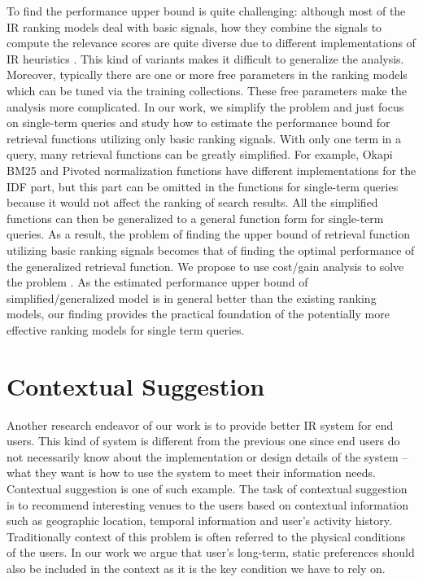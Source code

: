 To find the performance upper bound is quite challenging: although most of 
the IR ranking models deal with basic signals, how they combine the signals 
to compute the relevance scores are quite diverse due to different 
implementations of IR heuristics \cite{Fang:2004:FSI:1008992.1009004}. 
This kind of variants makes it difficult to generalize the analysis. 
Moreover, typically there are one or more free parameters in the ranking 
models which can be tuned via the training collections. 
These free parameters make the analysis more complicated.
In our work, we simplify the problem and just focus on single-term queries 
and study how to estimate the performance bound for retrieval functions 
utilizing only basic ranking signals. 
With only one term in a query, many retrieval functions can be greatly 
simplified. For example, Okapi BM25 and Pivoted normalization functions have 
different implementations for the IDF part, but this part can be omitted in the 
functions for single-term queries because it would not affect the ranking of 
search results. All the simplified functions can then be generalized to a 
general function form for single-term queries. As a result, the problem of 
finding the upper bound of retrieval function utilizing basic ranking signals 
becomes that of finding the optimal performance of the generalized retrieval 
function. We propose to use cost/gain analysis to solve the problem \cite{export:132652,export:68133,export:81144}. 
As the estimated performance upper bound of simplified/generalized model is 
in general better than the existing ranking models, our finding provides the 
practical foundation of the potentially more effective ranking models for 
single term queries.

\section{Contextual Suggestion}
Another research endeavor of our work is to provide better IR system for 
end users. This kind of system is different from the previous one since end 
users do not necessarily know about the implementation or design details of 
the system -- what they want is how to use the system to meet their information 
needs. Contextual suggestion is one of such example. 
The task of contextual suggestion is to recommend interesting venues to the 
users based on contextual information such as geographic location, 
temporal information and user's activity history. Traditionally context of 
this problem is often referred to the physical conditions of the users. 
In our work we argue that user's long-term, static preferences should also 
be included in the context as it is the key condition we have to rely on.

